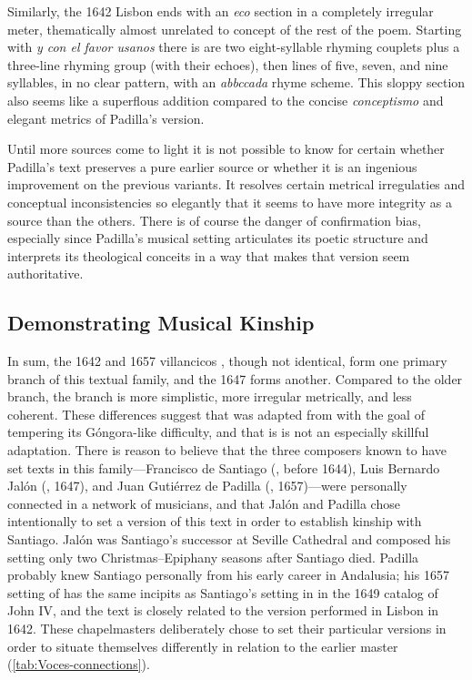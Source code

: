 Similarly, the 1642 Lisbon  ends with an \emph{eco} section in a
completely irregular meter, thematically almost unrelated to concept of the rest
of the poem.
Starting with \emph{y con el favor usanos} there is are two eight-syllable
rhyming couplets plus a three-line rhyming group (with their echoes), then lines
of five, seven, and nine syllables, in no clear pattern, with an \emph{abbccada}
rhyme scheme.
This sloppy section also seems like a superflous addition compared to the
concise \emph{conceptismo} and elegant metrics of Padilla's version.

Until more sources come to light it is not possible to know for certain whether
Padilla's text preserves a pure earlier source or whether it is an ingenious
improvement on the previous variants.
It resolves certain metrical irregulaties and conceptual inconsistencies so
elegantly that it seems to have more integrity as a source than the others.
There is of course the danger of confirmation bias, especially since Padilla's
musical setting articulates its poetic structure and interprets its theological
conceits in a way that makes that version seem authoritative.


\subsection{Demonstrating Musical Kinship}

In sum, the 1642 and 1657 villancicos , though
not identical, form one primary branch of this textual family, and the 1647
 forms another.
Compared to the older  branch, the  branch is
more simplistic, more irregular metrically, and less coherent.
These differences suggest that  was adapted from 
with the goal of tempering its Góngora-like difficulty, and that is is not an
especially skillful adaptation.
There is reason to believe that the three composers known to have set texts in
this family---Francisco de Santiago (, before 1644), Luis Bernardo
Jalón (, 1647), and Juan Gutiérrez de Padilla (,
1657)---were personally connected in a network of musicians, and that Jalón and
Padilla chose intentionally to set a version of this text in order to establish
kinship with Santiago.
Jalón was Santiago's successor at Seville Cathedral and composed his
 setting only two Christmas--Epiphany seasons after Santiago
died.
Padilla probably knew Santiago personally from his early career in Andalusia;
his 1657 setting of  has the same incipits as Santiago's setting
in in the 1649 catalog of John IV, and the text is closely related to the
version performed in Lisbon in 1642.
These chapelmasters deliberately chose to set their particular versions in order
to situate themselves differently in relation to the earlier master
(\cref{tab:Voces-connections}).

